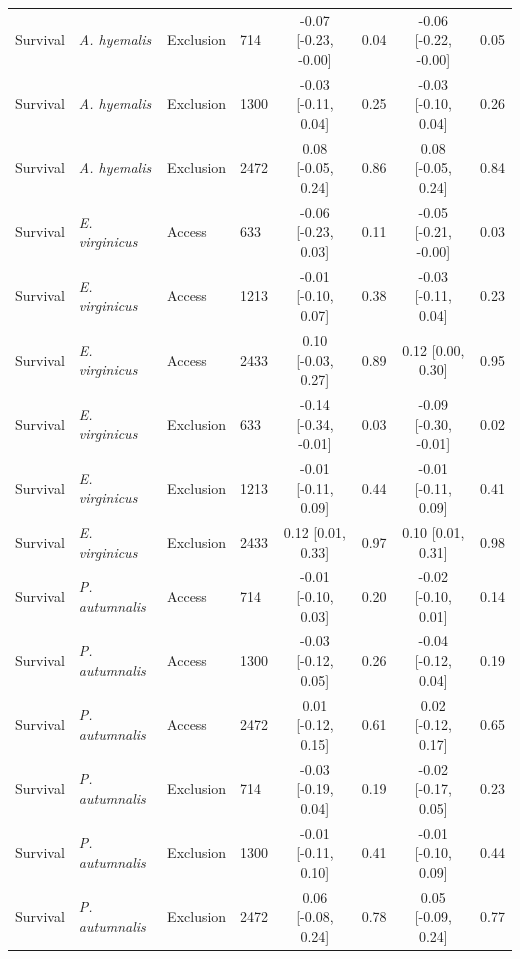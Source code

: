 \begin{landscape}
\begin{longtable}{llllcccc}
  Survival & \textit{A. hyemalis} & Exclusion & 714 & -0.07 [-0.23, -0.00] & 0.04 & -0.06 [-0.22, -0.00] & 0.05 \\
  Survival & \textit{A. hyemalis} & Exclusion & 1300 & -0.03 [-0.11, 0.04] & 0.25 & -0.03 [-0.10, 0.04] & 0.26 \\
  Survival & \textit{A. hyemalis} & Exclusion & 2472 & 0.08 [-0.05, 0.24] & 0.86 & 0.08 [-0.05, 0.24] & 0.84 \\
  Survival & \textit{E. virginicus} & Access & 633 & -0.06 [-0.23, 0.03] & 0.11 & -0.05 [-0.21, -0.00] & 0.03 \\
  Survival & \textit{E. virginicus} & Access & 1213 & -0.01 [-0.10, 0.07] & 0.38 & -0.03 [-0.11, 0.04] & 0.23 \\
  Survival & \textit{E. virginicus} & Access & 2433 & 0.10 [-0.03, 0.27] & 0.89 & 0.12 [0.00, 0.30] & 0.95 \\
  Survival & \textit{E. virginicus} & Exclusion & 633 & -0.14 [-0.34, -0.01] & 0.03 & -0.09 [-0.30, -0.01] & 0.02 \\
  Survival & \textit{E. virginicus} & Exclusion & 1213 & -0.01 [-0.11, 0.09] & 0.44 & -0.01 [-0.11, 0.09] & 0.41 \\
  Survival & \textit{E. virginicus} & Exclusion & 2433 & 0.12 [0.01, 0.33] & 0.97 & 0.10 [0.01, 0.31] & 0.98 \\
  Survival & \textit{P. autumnalis} & Access & 714 & -0.01 [-0.10, 0.03] & 0.20 & -0.02 [-0.10, 0.01] & 0.14 \\
  Survival & \textit{P. autumnalis} & Access & 1300 & -0.03 [-0.12, 0.05] & 0.26 & -0.04 [-0.12, 0.04] & 0.19 \\
  Survival & \textit{P. autumnalis} & Access & 2472 & 0.01 [-0.12, 0.15] & 0.61 & 0.02 [-0.12, 0.17] & 0.65 \\
  Survival & \textit{P. autumnalis} & Exclusion & 714 & -0.03 [-0.19, 0.04] & 0.19 & -0.02 [-0.17, 0.05] & 0.23 \\
  Survival & \textit{P. autumnalis} & Exclusion & 1300 & -0.01 [-0.11, 0.10] & 0.41 & -0.01 [-0.10, 0.09] & 0.44 \\
  Survival & \textit{P. autumnalis} & Exclusion & 2472 & 0.06 [-0.08, 0.24] & 0.78 & 0.05 [-0.09, 0.24] & 0.77 \\
\end{longtable}
\end{landscape}